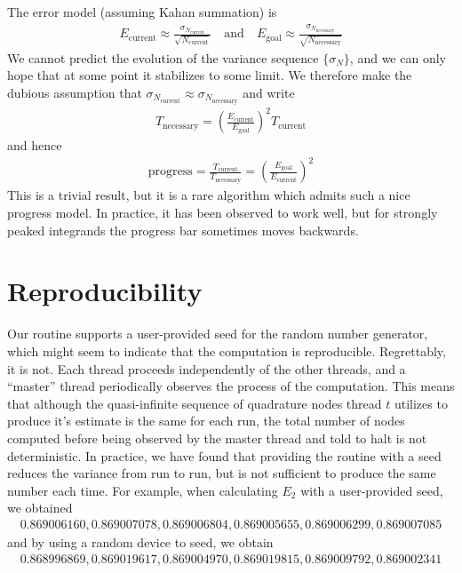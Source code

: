 \documentclass{ansarticle}
\begin{document}
The error model (assuming Kahan summation) is
\begin{align*}
E_{\mathrm{current}} \approx \frac{\sigma_{N_{\mathrm{current}}}}{\sqrt{N_{\mathrm{current}}}}
\quad \mathrm{and} \quad
E_{\mathrm{goal}} \approx \frac{\sigma_{N_{\mathrm{necessary}}}}{\sqrt{N_{\mathrm{necessary}}}}
\end{align*}
We cannot predict the evolution of the variance sequence $\{\sigma_{N}\}$, and we can only hope that at some point it stabilizes to some limit.
We therefore make the dubious assumption that $\sigma_{N_{\mathrm{current}}} \approx \sigma_{N_{\mathrm{necessary}}}$ and write
\begin{align*}
T_{\mathrm{necessary}} = \left( \frac{E_{\mathrm{current}}}{E_{\mathrm{goal}}} \right)^{2}T_{\mathrm{current}}
\end{align*}
and hence
\begin{align*}
\mathrm{progress} = \frac{T_{\mathrm{current}}}{T_{\mathrm{necessary}}} = \left( \frac{E_{\mathrm{goal}}}{E_{\mathrm{current}}} \right)^{2}
\end{align*}
This is a trivial result, but it is a rare algorithm which admits such a nice progress model.
In practice, it has been observed to work well, but for strongly peaked integrands the progress bar sometimes moves backwards.

\section{Reproducibility}

Our routine supports a user-provided seed for the random number generator, which might seem to indicate that the computation is reproducible.
Regrettably, it is not.
Each thread proceeds independently of the other threads, and a ``master'' thread periodically observes the process of the computation.
This means that although the quasi-infinite sequence of quadrature nodes thread $t$ utilizes to produce it's estimate is the same for each run,
the total number of nodes computed before being observed by the master thread and told to halt is not deterministic.
In practice, we have found that providing the routine with a seed reduces the variance from run to run, but is not sufficient to produce the same number each time.
For example, when calculating $E_{2}$ with a user-provided seed, we obtained
\begin{align*}
0.869006160,
0.869007078,
0.869006804,
0.869005655,
0.869006299,
0.869007085
\end{align*}
and by using a random device to seed, we obtain
\begin{align*}
0.868996869,
0.869019617,
0.869004970,
0.869019815,
0.869009792,
0.869002341
\end{align*}
\end{document}
